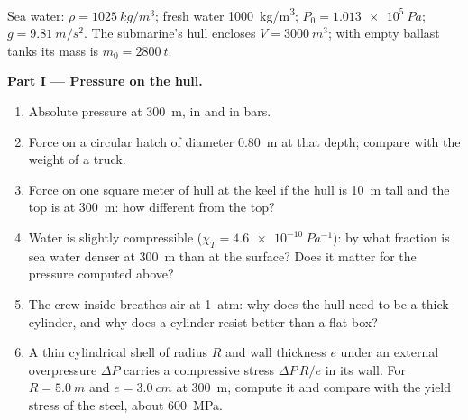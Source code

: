 \begin{problem}
\label{pb:b1:fluid-statics:1}
Sea water: $\rho = \qty{1025}{kg/m^3}$; fresh water \qty{1000}{kg/m^3};
$P_0 = \qty{1.013e5}{Pa}$; $g = \qty{9.81}{m/s^2}$. The submarine's hull
encloses $V = \qty{3000}{m^3}$; with empty ballast tanks its mass is
$m_0 = \qty{2800}{t}$.

\medskip
\noindent\textbf{Part I --- Pressure on the hull.}
\begin{enumerate}
  \item Absolute pressure at \qty{300}{m}, in  and in bars.
  \item Force on a circular hatch of diameter \qty{0.80}{m} at that depth;
        compare with the weight of a truck.
  \item Force on one square meter of hull at the keel if the hull is
        \qty{10}{m} tall and the top is at \qty{300}{m}: how different from
        the top?
  \item Water is slightly compressible ($\chi_T = \qty{4.6e-10}{Pa^{-1}}$):
        by what fraction is sea water denser at \qty{300}{m} than at the
        surface? Does it matter for the pressure computed above?
  \item The crew inside breathes air at \qty{1}{atm}: why does the hull
        need to be a thick cylinder, and why does a cylinder resist
        better than a flat box?
  \item A thin cylindrical shell of radius $R$ and wall thickness $e$
        under an external overpressure $\Delta P$ carries a compressive
        stress $\Delta P\,R/e$ in its wall. For $R = \qty{5.0}{m}$ and
        $e = \qty{3.0}{cm}$ at \qty{300}{m}, compute it and compare with the
        yield stress of the steel, about \qty{600}{MPa}.
\end{enumerate}


\end{problem}
